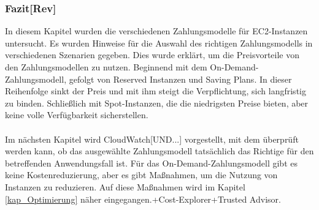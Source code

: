 \subsubsection*{Fazit[Rev]}
In diesem Kapitel wurden die verschiedenen Zahlungsmodelle für EC2-Instanzen untersucht. Es wurden Hinweise für die Auswahl des richtigen Zahlungsmodells in verschiedenen Szenarien gegeben. Dies wurde erklärt, um die Preisvorteile von den Zahlungsmodellen zu nutzen. Beginnend mit dem On-Demand-Zahlungsmodell, gefolgt von Reserved Instanzen und Saving Plans. In dieser Reihenfolge sinkt der Preis und mit ihm steigt die Verpflichtung, sich langfristig zu binden. Schließlich mit Spot-Instanzen, die die niedrigsten Preise bieten, aber keine volle Verfügbarkeit sicherstellen.
\\\\
Im nächsten Kapitel wird CloudWatch[UND...] vorgestellt, mit dem überprüft werden kann, ob das ausgewählte Zahlungsmodell tatsächlich das Richtige für den betreffenden Anwendungsfall ist. Für das On-Demand-Zahlungsmodell gibt es keine Kostenreduzierung, aber es gibt Maßnahmen, um die Nutzung von Instanzen zu reduzieren. Auf diese Maßnahmen wird im Kapitel \ref{kap_Optimierung} näher eingegangen.+Cost-Explorer+Trusted Advisor.
